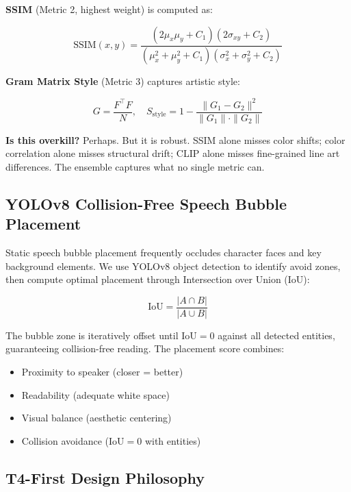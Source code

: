 \documentclass[11pt,a4paper,twocolumn]{article}
\begin{document}
\textbf{SSIM} (Metric 2, highest weight) is computed as:

\begin{equation}
\text{SSIM}(x,y) = \frac{(2\mu_x\mu_y + C_1)(2\sigma_{xy} + C_2)}{(\mu_x^2 + \mu_y^2 + C_1)(\sigma_x^2 + \sigma_y^2 + C_2)}
\label{eq:ssim}
\end{equation}

\textbf{Gram Matrix Style} (Metric 3) captures artistic style:

\begin{equation}
G = \frac{F^\top F}{N}, \quad S_{\text{style}} = 1 - \frac{\|G_1 - G_2\|^2}{\|G_1\| \cdot \|G_2\|}
\label{eq:gram}
\end{equation}

\textbf{Is this overkill?} Perhaps. But it is robust. SSIM alone misses color shifts; color correlation alone misses structural drift; CLIP alone misses fine-grained line art differences. The ensemble captures what no single metric can.

\subsection{YOLOv8 Collision-Free Speech Bubble Placement}
\label{sec:yolo}

Static speech bubble placement frequently occludes character faces and key background elements. We use YOLOv8 object detection to identify avoid zones, then compute optimal placement through Intersection over Union (IoU):

\begin{equation}
\text{IoU} = \frac{|A \cap B|}{|A \cup B|}
\label{eq:iou}
\end{equation}

The bubble zone is iteratively offset until $\text{IoU} = 0$ against all detected entities, guaranteeing collision-free reading. The placement score combines:

\begin{itemize}[nosep, leftmargin=*]
    \item Proximity to speaker (closer = better)
    \item Readability (adequate white space)
    \item Visual balance (aesthetic centering)
    \item Collision avoidance ($\text{IoU} = 0$ with entities)
\end{itemize}

\subsection{T4-First Design Philosophy}
\label{sec:t4opt}
\end{document}
